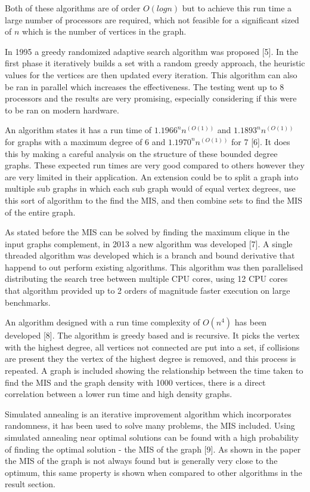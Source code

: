 \documentclass[conference]{IEEEtran}
\begin{document}
Both of these algorithms are of order $O(logn)$ but to achieve this run time a large number of processors are required,
which not feasible for a significant sized of $n$ which is the number of vertices in the graph.

In 1995 a greedy randomized adaptive search algorithm was proposed [5]. In the first phase it iteratively builds a set 
with a random greedy approach, the heuristic values for the vertices are then updated every iteration. This algorithm
can also be ran in parallel which increases the effectiveness. The testing went up to 8 processors and the results are
very promising, especially considering if this were to be ran on modern hardware.

An algorithm states it has a run time of $1.1966^n n^(O(1))$ and $1.1893^n n^(O(1))$ for graphs with a maximum degree
of 6 and $1.1970^n n^(O(1))$ for 7 [6]. It does this by making a careful analysis on the structure of these bounded degree
graphs. These expected run times are very good compared to others however they are very limited in their application.
An extension could be to split a graph into multiple sub graphs in which each sub graph would of equal vertex degrees,
use this sort of algorithm to the find the MIS, and then combine sets to find the MIS of the entire graph.

As stated before the MIS can be solved by finding the maximum clique in the input graphs complement, in 2013 a new 
algorithm was developed [7]. A single threaded algorithm was developed which is a branch and bound derivative that 
happend to out perform existing algorithms. This algorithm was then parallelised distributing the search tree between
multiple CPU cores, using 12 CPU cores that algorithm provided up to 2 orders of magnitude faster execution on large
benchmarks.

An algorithm designed with a run time complexity of $O(n^4)$ has been developed [8]. The algorithm is greedy based and 
is recursive. It picks the vertex with the highest degree, all vertices not connected are put into a set, if collisions
are present they the vertex of the highest degree is removed, and this process is repeated. A graph is included showing
the relationship between the time taken to find the MIS and the graph density with 1000 vertices, there is a direct 
correlation between a lower run time and high density graphs.

Simulated annealing is an iterative improvement algorithm which incorporates randomness, it has been used to solve many
problems, the MIS included. Using simulated annealing near optimal solutions can be found with a high probability of 
finding the optimal solution - the MIS of the graph [9]. As shown in the paper the MIS of the graph is not always found
but is generally very close to the optimum, this same property is shown when compared to other algorithms in the result 
section.
\end{document}
